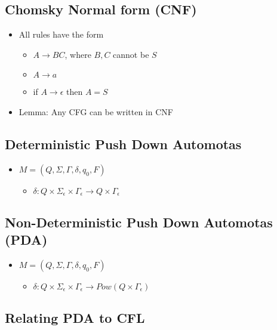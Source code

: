 \documentclass[11pt]{article}
\begin{document}
\subsection{Chomsky Normal form (CNF)}
\label{sec-3.2}

\begin{itemize}
\item All rules have the form

\begin{itemize}
\item $A\rightarrow BC$, where $B,C$ cannot be $S$
\item $A\rightarrow a$
\item if $A\rightarrow \epsilon$ then $A = S$
\end{itemize}

\item Lemma: Any CFG can be written in CNF
\end{itemize}
\subsection{Deterministic Push Down Automotas}
\label{sec-3.3}

\begin{itemize}
\item $M = (Q,\Sigma, \Gamma, \delta, q_0, F)$

\begin{itemize}
\item $\delta: Q \times \Sigma_\epsilon \times \Gamma_\epsilon
       \rightarrow Q \times \Gamma_\epsilon$
\end{itemize}

\end{itemize}
\subsection{Non-Deterministic Push Down Automotas (PDA)}
\label{sec-3.4}

\begin{itemize}
\item $M = (Q,\Sigma, \Gamma, \delta, q_0, F)$

\begin{itemize}
\item $\delta: Q \times \Sigma_\epsilon \times \Gamma_\epsilon
       \rightarrow Pow(Q \times \Gamma_\epsilon)$
\end{itemize}

\end{itemize}
\subsection{Relating PDA to CFL}
\label{sec-3.5}
\end{document}
